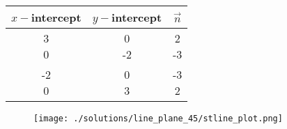 \begin{table}[htbp]
	\centering
	\begin{tabular}{|c|c|c|} \hline 
	$x-$intercept & $y-$intercept & \quad $\vec{n}$  \\ \hline \hline
	\myvec{3\\0}	&	\myvec{0\\-2}	&	\myvec{2\\-3} \\ \hline
	\myvec{-2\\0}	&	\myvec{0\\3}	&	\myvec{-3\\2} \\ \hline
	\end{tabular}
	\caption{} \label{coeftable}
\end{table}
\begin{figure}[!h]
\texttt{[image: ./solutions/line\_plane\_45/stline\_plot.png]}
	\caption{}  \label{linefig1:solutions/line_plane_45/} 
\end{figure}



